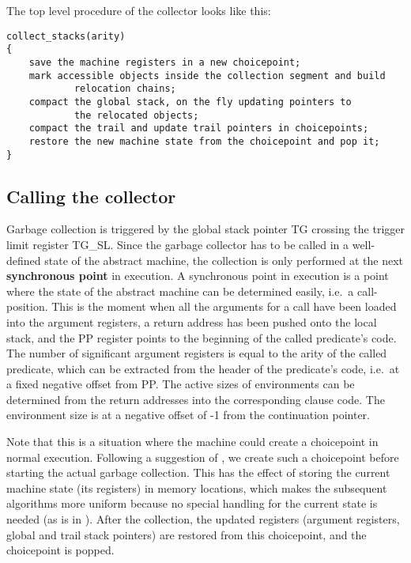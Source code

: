 \noindent
The top level procedure of the collector looks like this:
\begin{verbatim}
collect_stacks(arity)
{
    save the machine registers in a new choicepoint;
    mark accessible objects inside the collection segment and build
            relocation chains;
    compact the global stack, on the fly updating pointers to
            the relocated objects;
    compact the trail and update trail pointers in choicepoints;
    restore the new machine state from the choicepoint and pop it;
}
\end{verbatim}


\subsection{Calling the collector}

Garbage collection is triggered by the global stack pointer TG crossing the
trigger limit register TG_SL.
Since the garbage collector has to be called in a well-defined state of
the abstract machine, the collection is only performed at the next
{\bf synchronous point} in execution.
A synchronous point in execution is a point where the state of the
abstract machine can be determined easily, i.e.\ a call-position.
This is the moment when all the arguments for a call have been loaded
into the argument registers, a return address has been pushed onto
the local stack, and the PP register points to the beginning of the
called predicate's code. The number of significant argument registers
is equal to the arity of the called predicate, which can be extracted
from the header of the predicate's code, i.e.\ at a fixed negative
offset from PP. The active sizes of environments can be determined
from the return addresses into the corresponding clause code.
The environment size is at a negative offset of -1 from the
continuation pointer.

Note that this is a situation where the machine could create a choicepoint
in normal execution. Following a suggestion of \cite{bark87}, we create
such a choicepoint before starting the actual garbage collection.
This has the effect of storing the current machine state (its registers)
in memory locations, which makes the subsequent algorithms more uniform
because no special handling for the current state is needed
(as is in \cite{achs}).
After the collection, the updated registers (argument registers,
global and trail stack pointers) are restored from this choicepoint,
and the choicepoint is popped.


